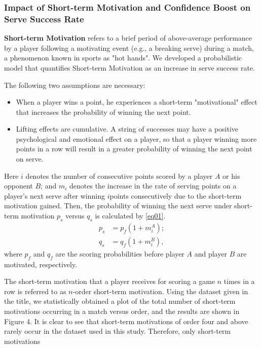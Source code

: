\documentclass{mcmthesis}
\begin{document}
\subsubsection{Impact of Short-term Motivation and Confidence Boost on Serve Success Rate}
\textbf{Short-term Motivation} refers to a brief period of above-average performance by a player
following a motivating event (e.g., a breaking serve) during a match, a phenomenon known
in sports as "hot hands". We developed a probabilistic model that quantifies Short-term
Motivation as an increase in serve success rate.\par
The following two assumptions are necessary:
\begin{itemize}
  \item When a player wins a point, he experiences a short-term "motivational" effect that increases
  the probability of winning the next point.
  \item Lifting effects are cumulative. A string of successes may have a positive psychological
  and emotional effect on a player, so that a player winning more points in a row will result
  in a greater probability of winning the next point on serve.
\end{itemize}
Here $i$ denotes the number of consecutive points scored by a player $A$ or his opponent $B$;
and $m_i$ denotes the increase in the rate of serving points on a player’s next serve after winning
$i$points consecutively due to the short-term motivation gained. Then, the probability of winning
the next serve under short-term motivation $p_s$ versus $q_s$ is calculated by \eqref{eq01}.
\begin{equation}
  \begin{split}
    p_s &= p_f(1+m_i^A);\\
    q_s &= q_f(1+m_i^B),
  \end{split}
  \label{eq01}
\end{equation}
where $p_f$ and $q_f$ are the scoring probabilities before player $A$ and player $B$ are motivated,
respectively.\par
The short-term motivation that a player receives for scoring a game $n$ times in a row is
referred to as $n$-order short-term motivation. Using the dataset given in the title, we statistically
obtained a plot of the total number of short-term motivations occurring in a match versus order,
and the results are shown in Figure 4. It is clear to see that short-term motivations of order four
and above rarely occur in the dataset used in this study. Therefore, only short-term motivations
\end{document}
